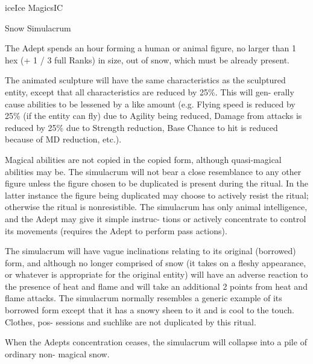 \begin{College}[1.5]{ice}{Ice Magics}{IC}
\begin{ritual}[R-1]{Snow Simulacrum}
\begin{effects}
The Adept spends an hour forming a human or animal figure, no larger
than 1 hex (+ 1 / 3 full Ranks) in size, out of snow, which must be
already present.

The animated sculpture will have the same characteristics as the
sculptured entity, except that all characteristics are reduced by
25\%. This will gen- erally cause abilities to be lessened by a like
amount (e.g.  Flying speed is reduced by 25\% (if the entity can fly)
due to Agility being reduced, Damage from attacks is reduced by 25\%
due to Strength reduction, Base Chance to hit is reduced because of MD
reduction, etc.).

Magical abilities are not copied in the copied form, although
quasi-magical abilities may be. The simulacrum will not bear a close
resemblance to any other figure unless the figure chosen to be
duplicated is present during the ritual.  In the latter instance the
figure being duplicated may choose to actively resist the ritual;
otherwise the ritual is nonresistible.  The simulacrum has only animal
intelligence, and the Adept may give it simple instruc- tions or
actively concentrate to control its movements (requires the Adept to
perform pass actions).

The simulacrum will have vague inclinations relating to its original
(borrowed) form, and although no longer comprised of snow (it takes on
a fleshy appearance, or whatever is appropriate for the original
entity) will have an adverse reaction to the presence of heat and
flame and will take an additional 2 points from heat and flame
attacks.  The simulacrum normally resembles a generic example of its
borrowed form except that it has a snowy sheen to it and is cool to
the touch.  Clothes, pos- sessions and suchlike are not duplicated by
this ritual.

When the Adepts concentration ceases, the simulacrum will collapse
into a pile of ordinary non- magical snow.
\end{effects}
\end{ritual}



\end{College}

